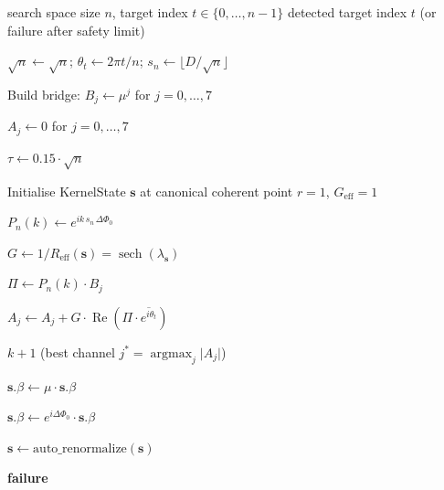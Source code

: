 \documentclass[12pt,a4paper]{article}
\theoremstyle{plain}
\theoremstyle{definition}
\theoremstyle{remark}
\newcommand{\abs}[1]{\lvert #1 \rvert}
\begin{document}
\begin{algorithm}[H]
\caption{Deterministic $\Theta(\sqrt{n})$ Coherent Phase Search}
\label{alg:main}
\begin{algorithmic}[1]
\Require search space size $n$, target index $t \in \{0,\ldots,n-1\}$
\Ensure detected target index $t$ (or failure after safety limit)

\State $\sqrt{n} \gets \sqrt{n}$;\quad
       $\theta_t \gets 2\pi t/n$;\quad
       $s_n \gets \lfloor D/\sqrt{n}\rfloor$

\State Build bridge: $B_j \gets \mu^j$ for $j=0,\ldots,7$

\State $A_j \gets 0$ for $j=0,\ldots,7$

\State $\tau \gets 0.15\cdot\sqrt{n}$

\State Initialise KernelState $\mathbf{s}$ at canonical coherent point
       $r=1$, $G_{\text{eff}}=1$

  \State $P_n(k) \gets e^{ik\,s_n\,\Delta\Phi_0}$

  \State $G \gets 1/R_{\text{eff}}(\mathbf{s}) = \operatorname{sech}(\lambda_{\mathbf{s}})$

    \State $\Pi \gets P_n(k) \cdot B_j$

    \State $A_j \gets A_j + G\cdot\operatorname{Re}(\Pi\cdot\overline{e^{i\theta_t}})$
  \EndFor

  \If{$\max_j \abs{A_j} \ge \tau$}
    \State \Return $k+1$ \quad (best channel $j^* = \operatorname{argmax}_j\abs{A_j}$)
  \EndIf

  \State $\mathbf{s}.\beta \gets \mu\cdot\mathbf{s}.\beta$

  \State $\mathbf{s}.\beta \gets e^{i\Delta\Phi_0}\cdot\mathbf{s}.\beta$

  \If{$\mathbf{s}$ has drift ($\abs{R(r)} > \varepsilon$)}
    \State $\mathbf{s} \gets \text{auto\_renormalize}(\mathbf{s})$
  \EndIf
\EndFor

\State \Return \textbf{failure} 
\end{algorithmic}
\end{algorithm}
\end{document}
